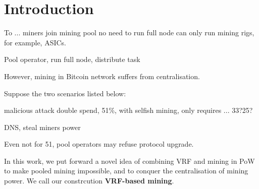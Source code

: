 \section{Introduction}




To ... 
miners join mining pool
no need to run full node 
can only run mining rigs, for example, ASICs.

Pool operator, run full node, distribute task

However, mining in Bitcoin network suffers from centralisation.



Suppose the two scenarios listed below:



malicious attack
double spend, 51\%, with selfish mining, only requires ... 33?25?

DNS, steal miners power


Even not for 51, 
pool operators may refuse protocol upgrade. 


In this work, we put forward a novel idea of combining VRF and mining in PoW to make pooled mining impossible, and to conquer the centralisation of mining power.
We call our constrcution \textbf{VRF-based mining}.